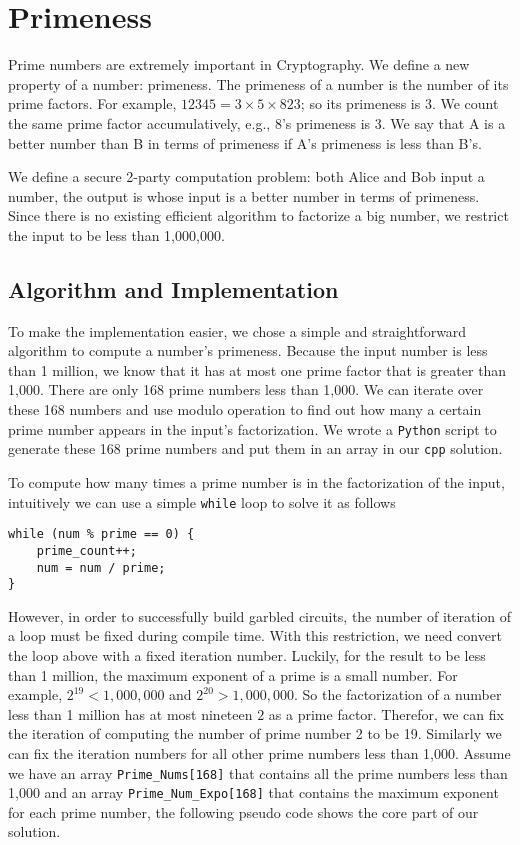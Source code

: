 \section{Primeness}
Prime numbers are extremely important in Cryptography. We define a new
property of a number: primeness. The primeness of a number is the number of
its prime factors. For example, $12345 = 3 \times 5 \times 823$;
so its primeness is 3.  We count the same prime factor accumulatively,
e.g., 8's primeness is 3.
We say that A is a better number than B in terms of primeness if A's primeness
is less than B's.

We define a secure 2-party computation problem: both Alice and Bob input
a number, the output is whose input is a better number in terms of primeness.
Since there is no existing efficient algorithm to factorize a big number,
we restrict the input to be less than 1,000,000.

\subsection{Algorithm and Implementation}
To make the implementation easier, we chose a simple and straightforward
algorithm to compute a number's primeness. Because the input number is
less than 1 million, we know that it has at most one prime factor that is
greater than 1,000. There are only 168 prime numbers less than 1,000.
We can iterate over these 168 numbers and use modulo operation to find out
how many a certain prime number appears in the input's factorization.
We wrote a {\tt Python} script to generate these 168 prime numbers and
put them in an array in our {\tt cpp} solution.

To compute how many times a prime number is in the factorization of the input,
intuitively we can use a simple {\tt while} loop to solve it as follows

\begin{verbatim}
while (num % prime == 0) {
    prime_count++;
    num = num / prime;
}
\end{verbatim}

However, in order to successfully build garbled circuits, the number of
iteration of a loop must be fixed during compile time. With this restriction,
we need convert the loop above with a fixed iteration number.
Luckily, for the result to be less than 1 million, the maximum exponent of
a prime is a small number. For example, $2^{19} < 1,000,000$ and
$2^{20} > 1,000,000$. So the factorization of a number less than 1 million
has at most nineteen $2$ as a prime factor. Therefor, we can fix the
iteration of computing the number of prime number 2 to be 19. Similarly
we can fix the iteration numbers for all other prime numbers less than 1,000.
Assume we have an array {\tt Prime\_Nums[168]} that contains all the prime
numbers less than 1,000 and an array {\tt Prime\_Num\_Expo[168]} that
contains the maximum exponent for each prime number, the following
pseudo code shows the core part of our solution.


